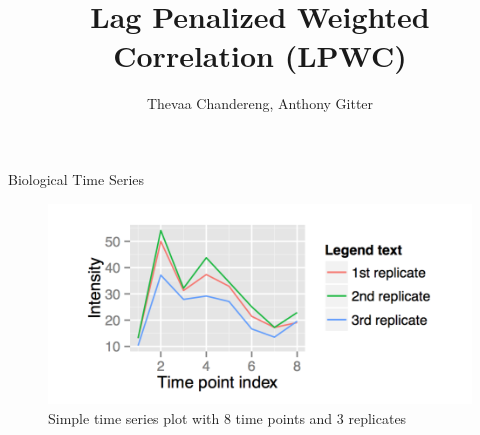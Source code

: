 \documentclass[10pt]{beamer}
\title{Lag Penalized Weighted Correlation (LPWC)}
\date{}
\author{Thevaa Chandereng, Anthony Gitter}
\begin{document}
\maketitle

\begin{frame}{Biological Time Series}

\begin{figure}
  \centering
    \includegraphics[width=1.0\textwidth]{Timeseries.png}
  \caption{Simple time series plot with 8 time points and 3 replicates}
\end{figure} 
   
\end{frame}


%    
%
%
%
%
%
\end{document}
